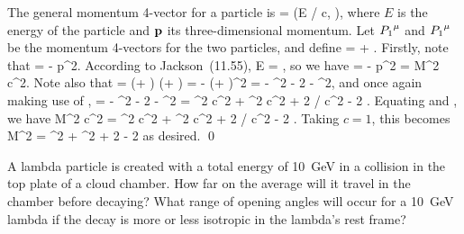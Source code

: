 \begin{solution}
	The general momentum 4-vector for a particle is
	\beq
		\Pmu = (E / c, \vp),
	\eeq
	where $E$ is the energy of the particle and $\vb{p}$ its three-dimensional momentum.  Let ${P_1}^\mu$ and ${P_1}^\mu$ be the momentum 4-vectors for the two particles, and define
	\beq
		\Pmu = \Pqmu + \Pwmu.
	\eeq
	Firstly, note that
	\beq
		\Pmu \Psmu =  - p^2.
	\eeq
	According to Jackson~(11.55),
	\beqn \label{E}
		E = ,
	\eeqn
	so we have
	\beqn \label{thing4.1}
		\Pmu \Psmu =  - p^2
		= M^2 c^2.
	\eeqn
	Note also that
	\beq
		\Pmu \Psmu = (\Pqmu + \Pwmu) (\Pqsmu + \Pwsmu)
		=  - (\vpq + \vpw)^2
		=  - \pq^2 - 2 \vpq \vdot \vpw - \pw^2,
	\eeq
	and once again making use of ,
	\beqn \label{thing4.2}
		\Pmu \Psmu =  - \pq^2 - 2 \vpq \vdot \vpw - \pw^2
		= \mq^2 c^2 + \mw^2 c^2 + 2 \Eq \Ew / c^2 - 2 \pq \pw \cos\tht.
	\eeqn
	Equating  and , we have
	\beq
		M^2 c^2 = \mq^2 c^2 + \mw^2 c^2 + 2 \Eq \Ew / c^2 - 2 \pq \pw \cos\tht.
	\eeq
	Taking $c = 1$, this becomes
	\beq
		M^2 = \mq^2 + \mw^2 + 2 \Eq \Ew - 2 \pq \pw \cos\tht
	\eeq
	as desired. \qed
\end{solution}



\newcommand{\ELam}{\SI{10}{\GeV}}

\begin{problem}
	A lambda particle is created with a total energy of {\ELam} in a collision in the top plate of a cloud chamber.  How far on the average will it travel in the chamber before decaying?  What range of opening angles will occur for a \SI{10}{\GeV} lambda if the decay is more or less isotropic in the lambda's rest frame?
\end{problem}

\newcommand{\Delt}{\Del t}
\newcommand{\lspeed}{\SI{3.00e8}{\meter\per\second}}

\newcommand{\vvq}{\vv_1}
\newcommand{\vvw}{\vv_2}

\newcommand{\Enucp}{\SI{944}{\MeV}}
\newcommand{\Epip}{\SI{171}{\MeV}}
\newcommand{\Enuc}{\SI{8422}{\MeV}}
\newcommand{\Epi}{\SI{1256}{\MeV}}

\newcommand{\gamnuc}{1.005}
\newcommand{\gampi}{1.221}
\newcommand{\gamLam}{8.969}

\newcommand{\pnucp}{\SI{98}{\MeV}}
\newcommand{\ppip}{\pnucp}
\newcommand{\pnuc}{\SI{8369}{\MeV}}
\newcommand{\ppi}{\SI{1248}{\MeV}}


